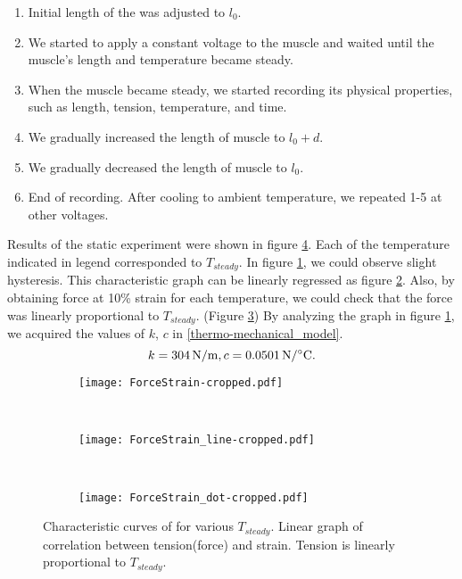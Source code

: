 \begin{enumerate}
\item Initial length of the \scp was adjusted to $l_0$.
\item We started to apply a constant voltage to the muscle and waited until the muscle's length and temperature became steady.
\item When the muscle became steady, we started recording its physical properties, such as length, tension, temperature, and time.
\item We gradually increased the length of muscle to $l_0+d$.
\item We gradually decreased the length of muscle to $l_0$.
\item End of recording. After cooling to ambient temperature, we repeated 1-5 at other voltages.
\end{enumerate}

Results of the static experiment were shown in figure \ref{static1_results}. Each of the temperature indicated in legend corresponded to $T_{steady}$. In figure \ref{static1_result}, we could observe slight hysteresis. This characteristic graph can be linearly regressed as figure \ref{static1_line}. Also, by obtaining force at 10\% strain for each temperature, we could check that the force was linearly proportional to $T_{steady}$. (Figure \ref{static1_dot}) By analyzing the graph in figure \ref{static1_result}, we acquired the values of $k$, $c$ in \eqref{thermo-mechanical_model}.
\begin{equation}
k=\SI{304}{\newton\per\meter}, c=\SI{0.0501}{\newton\per\degreeCelsius}. \notag
\end{equation}

\begin{figure}[t]
	\centering
	\begin{subfigure}[t]{0.32\textwidth}
		\texttt{[image: ForceStrain-cropped.pdf]}
		\caption{\label{static1_result}}
	\end{subfigure}
	~
	\begin{subfigure}[t]{0.32\textwidth}
		\texttt{[image: ForceStrain\_line-cropped.pdf]}
		\caption{\label{static1_line}}
	\end{subfigure}
	~
	\begin{subfigure}[t]{0.32\textwidth}
		\texttt{[image: ForceStrain\_dot-cropped.pdf]}
		\caption{\label{static1_dot}}
	\end{subfigure}
	\caption[Results of the static experiment]{ Characteristic curves of \scp for various $T_{steady}$.  Linear graph of correlation between tension(force) and strain.  Tension is linearly proportional to $T_{steady}$.}
	\label{static1_results}
\end{figure}

